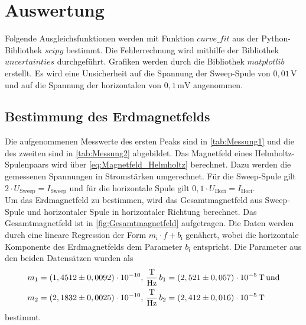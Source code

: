 \section{Auswertung}
\label{sec:auswertung}

Folgende Ausgleichsfunktionen werden mit Funktion $curve\_fit$ aus der Python\cite{py}-Bibliothek $scipy$\cite{2020SciPy-NMeth} bestimmt.
Die Fehlerrechnung wird mithilfe der Bibliothek $uncertainties$ \cite{unp} durchgeführt.
Grafiken werden durch die Bibliothek $matplotlib$\cite{Hunter:2007} erstellt. 
Es wird eine Unsicherheit auf die Spannung der Sweep-Spule von $0,01 \, \unit{\volt}$ und auf die Spannung der horizontalen von $0,1 \, \unit{\milli\volt} $ angenommen.

\subsection{Bestimmung des Erdmagnetfelds}

Die aufgenommenen Messwerte des ersten Peaks sind in \autoref{tab:Messung1} und die des zweiten sind in \autoref{tab:Messung2} abgebildet.
Das Magnetfeld eines Helmholtz-Spulenpaars wird über \eqref{eq:Magnetfeld_Helmholtz} berechnet.
Dazu werden die gemessenen Spannungen in Stromstärken umgerechnet.
Für die Sweep-Spule gilt $2 \cdot U_\text{Sweep} = I_\text{Sweep}$ und für die horizontale Spule gilt $0,1 \cdot U_\text{Hori} = I_\text{Hori}$.\\
Um das Erdmagnetfeld zu bestimmen, wird das Gesamtmagnetfeld aus Sweep-Spule und horizontaler Spule in horizontaler Richtung berechnet.
Das Gesamtmagnetfeld ist in \autoref{fig:Gesamtmagnetfeld} aufgetragen. 
Die Daten werden durch eine lineare Regression der Form $m_\text{i} \cdot f + b_\text{i}$ genähert,
wobei die horizontale Komponente des Erdmagnetfelds dem Parameter $b_\text{i}$ entspricht.
Die Parameter aus den beiden Datensätzen wurden als 
\begin{align*}
    &m_1 =   \left( 1,4512 \pm 0,0092 \right) \cdot 10^{-10},\, \unit{\dfrac{\tesla}{\hertz}} \, b_1 = \left( 2,521  \pm 0,057 \right) \cdot 10^{-5}\, \unit{\tesla} \, \text{und} \\
    &m_2 =   \left( 2,1832 \pm 0,0025 \right) \cdot 10^{-10},\, \unit{\dfrac{\tesla}{\hertz}} \, b_2 = \left( 2,412  \pm 0,016 \right) \cdot 10^{-5}\, \unit{\tesla} \\
\end{align*}
bestimmt.


